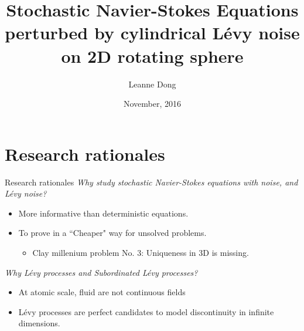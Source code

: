\documentclass[xcolor=dvipsnames,leqno]{beamer}
\title{Stochastic Navier-Stokes Equations perturbed by cylindrical L\'evy noise on 2D rotating sphere}
\author[Leanne Dong]{Leanne Dong\\\vspace{1cm}{\small Supervised by: Prof. Ben Goldys}}
\institute[Usyd]{School of Mathematics and Statistics\\
University of Sydney}
\date{November, 2016}
\begin{document}
	\begin{frame}
	  \titlepage
	\end{frame}

\section[]{Research rationales}  
\begin{frame}{Research rationales}
	\emph{Why study stochastic Navier-Stokes equations {\color{red}with noise, and L\'evy noise}?}
	\begin{itemize}         
		\item More informative than deterministic equations.
		\item To prove in a ``Cheaper" way for unsolved problems.\\
		\begin{itemize}
			\item Clay millenium problem No. 3: Uniqueness in 3D is missing.
		\end{itemize}
		
	\end{itemize}
	\emph{Why L\'evy processes and Subordinated L\'evy processes?}
	\begin{itemize}
		\item At atomic scale, fluid are not continuous fields
		\item L\'evy processes are perfect candidates to model discontinuity in infinite dimensions.
	\end{itemize} 
\end{frame}
\end{document}
